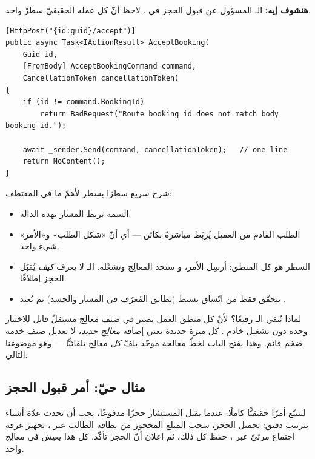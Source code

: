 \textbf{هنشوف إيه:} الـ  المسؤول عن قبول الحجز في .
لاحظ أنّ كل عمله الحقيقيّ سطرٌ واحد.

\begin{english}
\begin{lstlisting}[language={[Sharp]C}]
[HttpPost("{id:guid}/accept")]
public async Task<IActionResult> AcceptBooking(
    Guid id,
    [FromBody] AcceptBookingCommand command,
    CancellationToken cancellationToken)
{
    if (id != command.BookingId)
        return BadRequest("Route booking id does not match body booking id.");

    await _sender.Send(command, cancellationToken);   // one line
    return NoContent();
}
\end{lstlisting}
\end{english}

شرح سريع سطرًا بسطر لأهمّ ما في المقتطف:
\begin{itemize}
\item السمة \code{[HttpPost(...)]} تربط المسار  بهذه الدالة.
\item الطلب القادم من العميل يُربَط مباشرةً بكائن  — أي أنّ
  «شكل الطلب» و«الأمر» شيء واحد.
\item السطر  هو كل المنطق: أرسِل الأمر، و
  ستجد المعالِج وتشغّله. الـ  لا يعرف \emph{كيف} يُقبَل الحجز إطلاقًا.
\item يتحقّق فقط من اتّساق بسيط (تطابق المُعرّف في المسار والجسد) ثم يُعيد .
\end{itemize}

\begin{why}
لماذا نُبقي الـ  رفيعًا؟ لأنّ كل منطق العمل يصير في صنف معالِج مستقلّ
قابل للاختبار وحده دون تشغيل خادم . كل ميزة جديدة تعني إضافة \emph{معالِج جديد}،
لا تعديل صنف خدمة ضخم قائم. وهذا يفتح الباب لخطّ معالجة موحّد يلفّ \emph{كل} معالِج
تلقائيًّا — وهو موضوعنا التالي.
\end{why}

\subsection{مثال حيّ: أمر قبول الحجز}

لنتتبّع أمرًا حقيقيًّا كاملًا. عندما يقبل المستشار حجزًا مدفوعًا، يجب أن تحدث عدّة أشياء
بترتيب دقيق: تحميل الحجز، سحب المبلغ المحجوز من بطاقة الطالب عبر ، تجهيز غرفة
اجتماع مرئيّ عبر ، حفظ كل ذلك، ثم إعلان أنّ الحجز تأكّد. كل هذا يعيش في معالِج
واحد.

